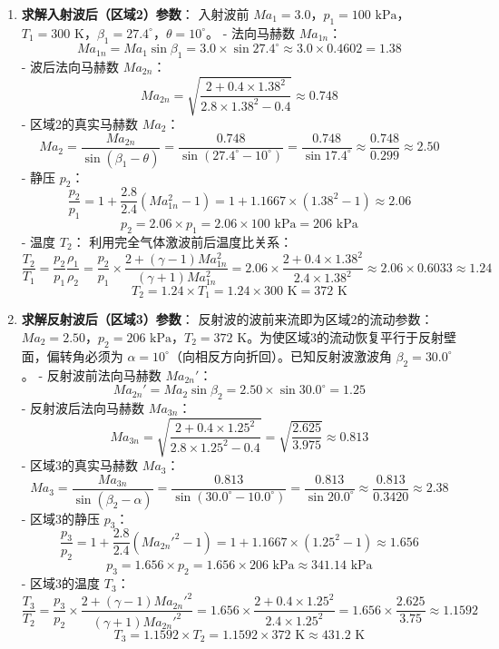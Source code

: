 \documentclass[11pt,a4paper]{ctexart}
\begin{document}
\begin{enumerate}
    \item \textbf{求解入射波后（区域2）参数}：
    入射波前 $Ma_1 = 3.0$，$p_1 = 100\text{ kPa}$，$T_1 = 300\text{ K}$，$\beta_1 = 27.4^\circ$，$\theta = 10^\circ$。
    - 法向马赫数 $Ma_{1n}$：
      \[
      Ma_{1n} = Ma_1 \sin \beta_1 = 3.0 \times \sin 27.4^\circ \approx 3.0 \times 0.4602 = 1.38
      \]
    - 波后法向马赫数 $Ma_{2n}$：
      \[
      Ma_{2n} = \sqrt{\frac{2 + 0.4 \times 1.38^2}{2.8 \times 1.38^2 - 0.4}} \approx 0.748
      \]
    - 区域2的真实马赫数 $Ma_2$：
      \[
      Ma_2 = \frac{Ma_{2n}}{\sin(\beta_1 - \theta)} = \frac{0.748}{\sin(27.4^\circ - 10^\circ)} = \frac{0.748}{\sin 17.4^\circ} \approx \frac{0.748}{0.299} \approx 2.50
      \]
    - 静压 $p_2$：
      \[
      \frac{p_2}{p_1} = 1 + \frac{2.8}{2.4}(Ma_{1n}^2 - 1) = 1 + 1.1667 \times (1.38^2 - 1) \approx 2.06
      \]
      \[
      p_2 = 2.06 \times p_1 = 2.06 \times 100\text{ kPa} = 206\text{ kPa}
      \]
    - 温度 $T_2$：
      利用完全气体激波前后温度比关系：
      \[
      \frac{T_2}{T_1} = \frac{p_2}{p_1} \frac{\rho_1}{\rho_2} = \frac{p_2}{p_1} \times \frac{2 + (\gamma - 1)Ma_{1n}^2}{(\gamma + 1)Ma_{1n}^2} = 2.06 \times \frac{2 + 0.4 \times 1.38^2}{2.4 \times 1.38^2} \approx 2.06 \times 0.6033 \approx 1.24
      \]
      \[
      T_2 = 1.24 \times T_1 = 1.24 \times 300\text{ K} = 372\text{ K}
      \]

    \item \textbf{求解反射波后（区域3）参数}：
    反射波的波前来流即为区域2的流动参数：$Ma_2 = 2.50$，$p_2 = 206\text{ kPa}$，$T_2 = 372\text{ K}$。为使区域3的流动恢复平行于反射壁面，偏转角必须为 $\alpha = 10^\circ$（向相反方向折回）。已知反射波激波角 $\beta_2 = 30.0^\circ$。
    - 反射波前法向马赫数 $Ma_{2n}'$：
      \[
      Ma_{2n}' = Ma_2 \sin \beta_2 = 2.50 \times \sin 30.0^\circ = 1.25
      \]
    - 反射波后法向马赫数 $Ma_{3n}$：
      \[
      Ma_{3n} = \sqrt{\frac{2 + 0.4 \times 1.25^2}{2.8 \times 1.25^2 - 0.4}} = \sqrt{\frac{2.625}{3.975}} \approx 0.813
      \]
    - 区域3的真实马赫数 $Ma_3$：
      \[
      Ma_3 = \frac{Ma_{3n}}{\sin(\beta_2 - \alpha)} = \frac{0.813}{\sin(30.0^\circ - 10.0^\circ)} = \frac{0.813}{\sin 20.0^\circ} \approx \frac{0.813}{0.3420} \approx 2.38
      \]
    - 区域3的静压 $p_3$：
      \[
      \frac{p_3}{p_2} = 1 + \frac{2.8}{2.4}(Ma_{2n}'^2 - 1) = 1 + 1.1667 \times (1.25^2 - 1) \approx 1.656
      \]
      \[
      p_3 = 1.656 \times p_2 = 1.656 \times 206\text{ kPa} \approx 341.14\text{ kPa}
      \]
    - 区域3的温度 $T_3$：
      \[
      \frac{T_3}{T_2} = \frac{p_3}{p_2} \times \frac{2 + (\gamma - 1)Ma_{2n}'^2}{(\gamma + 1)Ma_{2n}'^2} = 1.656 \times \frac{2 + 0.4 \times 1.25^2}{2.4 \times 1.25^2} = 1.656 \times \frac{2.625}{3.75} \approx 1.1592
      \]
      \[
      T_3 = 1.1592 \times T_2 = 1.1592 \times 372\text{ K} \approx 431.2\text{ K}
      \]
\end{enumerate}
\end{document}
